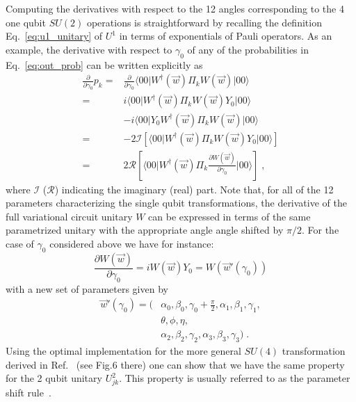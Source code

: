 Computing the derivatives with respect to the 12 angles corresponding to the 4 one qubit $SU(2)$ operations is straightforward by recalling the definition Eq.~\eqref{eq:u1_unitary} of $U^1$ in terms of exponentials of Pauli operators. As an example, the derivative with respect to $\gamma_0$ of any of the probabilities in Eq.~\eqref{eq:out_prob} can be written explicitly as
\begin{equation}
\begin{split}
\label{eq:gradient}
\frac{\partial}{\partial \gamma_0} p_k =& \frac{\partial}{\partial \gamma_0} \langle00\lvert W^\dagger(\vec{w})\Pi_kW(\vec{w})\rvert00\rangle\\
=&i\langle00\lvert W^\dagger(\vec{w})\Pi_kW(\vec{w})Y_0\rvert00\rangle\\
&-i\langle00\lvert Y_0W^\dagger(\vec{w})\Pi_kW(\vec{w})\rvert00\rangle\\
=&-2\mathcal{I}\left[\langle00\lvert W^\dagger(\vec{w})\Pi_kW(\vec{w})Y_0\rvert00\rangle\right]\\
=&2\mathcal{R}\left[\langle00\lvert W^\dagger(\vec{w})\Pi_k\frac{\partial W(\vec{w})}{\partial \gamma_0}\rvert00\rangle\right]\;,
\end{split}
\end{equation}
where $\mathcal{I}$ ($\mathcal{R}$) indicating the imaginary (real) part. Note that, for all of the 12 parameters characterizing the single qubit transformations, the derivative of the full variational circuit unitary $W$ can be expressed in terms of the same parametrized unitary with the appropriate angle angle shifted by $\pi/2$. For the case of $\gamma_0$ considered above we have for instance:
\begin{equation}
\frac{\partial W(\vec{w})}{\partial \gamma_0} = i W(\vec{w})Y_0 = W\left(\vec{w}'(\gamma_0)\right)
\end{equation}
with a new set of parameters given by
\begin{equation}
\begin{split}
\vec{w}'(\gamma_0) = \bigg(&\alpha_0,\beta_0,\gamma_0+\frac{\pi}{2},\alpha_1,\beta_1,\gamma_1,\\
&\theta,\phi,\eta,\\
&\alpha_2,\beta_2,\gamma_2,\alpha_3,\beta_3,\gamma_3\bigg)\;.
\end{split}
\end{equation}
Using the optimal implementation for the more general $SU(4)$ transformation derived in Ref.~\cite{vatan2004} (see Fig.6 there) one can show that we have the same property for the 2 qubit unitary $U^2_{jk}$. This property is usually referred to as the parameter shift rule~\cite{Mitarai_2018,Schuld_2019}.

